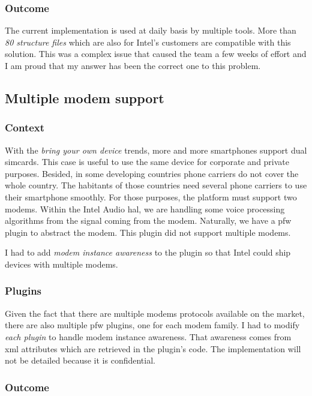 \subsubsection{Outcome}

The current implementation is used at daily basis by multiple tools.
More than \emph{80 structure files} which are also for Intel's customers are compatible with this solution.
This was a complex issue that caused the team a few weeks of effort and I am proud that my answer has been the
correct one to this problem.


\subsection{Multiple modem support}
\subsubsection{Context}
With the \emph{bring your own device} trends, more and more smartphones support dual simcards. This case
is useful to use the same device for corporate and private purposes.
Besided, in some developing countries phone carriers do not cover the whole country. The habitants of those
countries need several phone carriers to use their smartphone smoothly.
For those purposes, the platform must support two modems.
Within the Intel Audio \gls{hal}, we are handling some voice processing algorithms from the signal coming from the modem.
Naturally, we have a \gls{pfw} plugin to abstract the modem. This plugin did not support multiple modems.

I had to add \emph{modem instance awareness} to the plugin so that Intel could ship devices with multiple modems.

\subsubsection{Plugins}
Given the fact that there are multiple modems protocols available on the market, there are also multiple \gls{pfw} plugins,
one for each modem family.
I had to modify \emph{each plugin} to handle modem instance awareness. That awareness comes from \gls{xml} attributes which are
retrieved in the plugin's code.
The implementation will not be detailed because it is confidential.

\subsubsection{Outcome}

